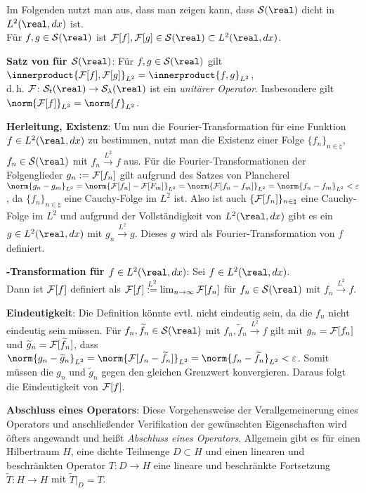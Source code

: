 Im Folgenden nutzt man aus, dass man zeigen kann, dass
$\S(\real)$ dicht in $L^2(\real, dx)$ ist.\\
Für $f, g \in \S(\real)$ ist
$\F[f], \F[g] \in \S(\real) \subset L^2(\real, dx)$.

\textbf{Satz von  für $\S(\real)$}:
Für $f, g \in \S(\real)$ gilt
$\innerproduct{\F[f], \F[g]}_{L^2} = \innerproduct{f, g}_{L^2}$,\\
d.\,h. $\F\colon \S_t(\real) \rightarrow \S_\lambda(\real)$ ist ein
\emph{unitärer Operator}.
Insbesondere gilt $\norm{\F[f]}_{L^2} = \norm{f}_{L^2}$.

\linie

\textbf{Herleitung, Existenz}:
Um nun die Fourier-Transformation für eine Funktion $f \in L^2(\real, dx)$ zu
bestimmen, nutzt man die Existenz einer Folge $\{f_n\}_{n \in \natural}$,
$f_n \in \S(\real)$ mit $f_n \xrightarrow{L^2} f$
aus.
Für die Fourier-Transformationen der Folgenglieder
$g_n := \mathcal{F}[f_n]$ gilt aufgrund des Satzes von Plancherel
$\norm{g_n - g_m}_{L^2} = \norm{\F[f_n] - \F[F_m]}_{L^2} =
\norm{\F[f_n - f_m]}_{L^2} = \norm{f_n - f_m}_{L^2} < \varepsilon$,
da $\{f_n\}_{n \in \natural}$ eine Cauchy-Folge im $L^2$ ist.
Also ist auch $\{\mathcal{F}[f_n]\}_{n \in \natural}$ eine Cauchy-Folge im $L^2$ und
aufgrund der Vollständigkeit von $L^2(\real, dx)$ gibt es ein
$g \in L^2(\real, dx)$ mit $g_n \xrightarrow{L^2} g$.
Dieses $g$ wird als Fourier-Transformation von $f$ definiert.

\textbf{-Transformation für $f \in L^2(\real, dx)$}:
Sei $f \in L^2(\real, dx)$.\\
Dann ist $\mathcal{F}[f]$ definiert als
$\mathcal{F}[f] \overset{L^2}{:=} \lim_{n \to \infty} \mathcal{F}[f_n]$
für $f_n \in \S(\real)$ mit $f_n \xrightarrow{L^2} f$.

\textbf{Eindeutigkeit}:
Die Definition könnte evtl. nicht eindeutig sein, da die $f_n$ nicht eindeutig
sein müssen.
Für $f_n, \widetilde{f}_n \in \S(\real)$ mit
$f_n, \widetilde{f}_n \xrightarrow{L^2} f$ gilt
mit $g_n = \mathcal{F}[f_n]$ und $\widetilde{g}_n = \mathcal{F}[\widetilde{f}_n]$, dass
$\norm{g_n - \widetilde{g}_n}_{L^2} = \norm{\F[f_n - \widetilde{f}_n]}_{L^2} =
\norm{f_n - \widetilde{f}_n}_{L^2} < \varepsilon$.
Somit müssen die $g_n$ und $\widetilde{g}_n$ gegen den gleichen Grenzwert
konvergieren.
Daraus folgt die Eindeutigkeit von $\mathcal{F}[f]$.

\textbf{Abschluss eines Operators}:
Diese Vorgehensweise der Verallgemeinerung eines Operators und anschließender
Verifikation der gewünschten Eigenschaften wird öfters angewandt und heißt
\emph{Abschluss eines Operators}.
Allgemein gibt es für einen Hilbertraum $H$, eine dichte Teilmenge
$D \subset H$ und einen linearen und beschränkten Operator
$T\colon D \rightarrow H$ eine lineare und beschränkte Fortsetzung
$\widetilde{T}\colon H \rightarrow H$ mit $\widetilde{T}|_D = T$.

